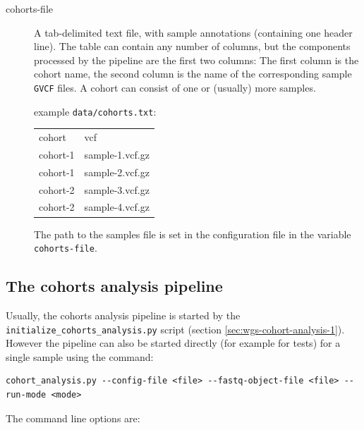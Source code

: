 \documentclass[a4paper]{article}
\begin{document}
\begin{description}

\item[cohorts-file] A tab-delimited text file, with sample annotations
  (containing one header line). The table can contain any number of
  columns, but the components processed by the pipeline are the first
  two columns: The first column is the cohort name, the second column
  is the name of the corresponding sample \texttt{GVCF} files. A
  cohort can consist of one or (usually) more samples.

  example \texttt{data/cohorts.txt}:

  {\scriptsize
    {\ttfamily
      \begin{tabular}{ll}

        cohort & vcf \\
        cohort-1 & sample-1.vcf.gz \\
        cohort-1 & sample-2.vcf.gz \\
        cohort-2 & sample-3.vcf.gz \\
        cohort-2 & sample-4.vcf.gz \\
      \end{tabular}
    }
  }

  The path to the samples file is set in the configuration file in the
  variable \texttt{cohorts-file}.

\end{description}

\subsection{The cohorts analysis pipeline}
\label{sec:cohorts-analys-pipel-1}

Usually, the cohorts analysis pipeline is started by the
\texttt{initialize\_cohorts\_analysis.py} script (section
\ref{sec:wgs-cohort-analysis-1}). However the pipeline can also be
started directly (for example for tests) for a single sample using the
command:

\begin{lstlisting}
cohort_analysis.py --config-file <file> --fastq-object-file <file> --run-mode <mode>
\end{lstlisting}

The command line options are:
\end{document}
